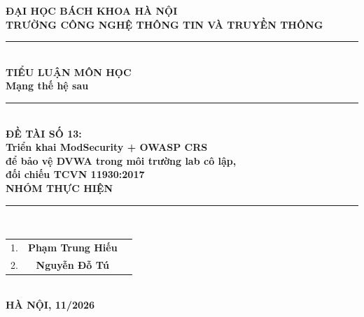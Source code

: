\documentclass[12pt,a4paper,twoside]{report}
\begin{document}
\thispagestyle{empty}
\begin{titlepage}
\begin{center}
\textbf{\large ĐẠI HỌC BÁCH KHOA HÀ NỘI}\\[0.1cm]
\textbf{\large TRƯỜNG CÔNG NGHỆ THÔNG TIN VÀ TRUYỀN THÔNG}\\[1.5cm]
\noindent\rule{\textwidth}{1pt}\\[0.5cm]
\textbf{\Large TIỂU LUẬN MÔN HỌC}\\[0.5cm]
\textbf{\Large Mạng thế hệ sau}\\[1cm]
\noindent\rule{\textwidth}{1pt}\\[1cm]
\textbf{\Large ĐỀ TÀI SỐ 13:}\\[0.4cm]
\textbf{\Large Triển khai ModSecurity + OWASP CRS}\\[0.2cm]
\textbf{\Large để bảo vệ DVWA trong môi trường lab cô lập,}\\[0.2cm]
\textbf{\Large đối chiếu TCVN 11930:2017}\\[1.5cm]
\textbf{\large NHÓM THỰC HIỆN}\\[0.3cm]
\noindent\rule{5cm}{0.5pt}\\[0.5cm]
\begin{tabular}{ccl}
1. & \textbf{Phạm Trung Hiếu} \\
2. & \textbf{Nguyễn Đỗ Tú} & \\
\end{tabular}\\[1.5cm]
\vfill
\textbf{HÀ NỘI, 11/2026}
\end{center}
\end{titlepage}
\end{document}
